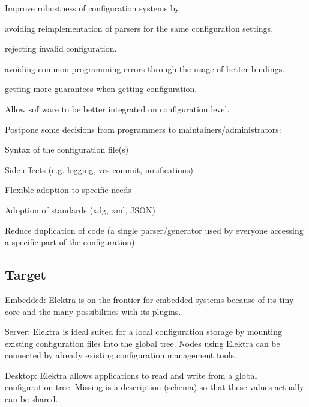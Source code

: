 
\begin{DoxyItemize}
\item Improve robustness of configuration systems by
\begin{DoxyItemize}
\item avoiding reimplementation of parsers for the same configuration settings.
\item rejecting invalid configuration.
\item avoiding common programming errors through the usage of better bindings.
\item getting more guarantees when getting configuration.
\end{DoxyItemize}
\item Allow software to be better integrated on configuration level.
\item Postpone some decisions from programmers to maintainers/administrators\+:
\begin{DoxyItemize}
\item Syntax of the configuration file(s)
\item Side effects (e.\+g. logging, vcs commit, notifications)
\item Flexible adoption to specific needs
\item Adoption of standards (xdg, xml, J\+S\+ON)
\end{DoxyItemize}
\item Reduce duplication of code (a single parser/generator used by everyone accessing a specific part of the configuration).
\end{DoxyItemize}

\subsection*{Target}


\begin{DoxyItemize}
\item Embedded\+: Elektra is on the frontier for embedded systems because of its tiny core and the many possibilities with its plugins.
\item Server\+: Elektra is ideal suited for a local configuration storage by mounting existing configuration files into the global tree. Nodes using Elektra can be connected by already existing configuration management tools.
\item Desktop\+: Elektra allows applications to read and write from a global configuration tree. Missing is a description (schema) so that these values actually can be shared.
\end{DoxyItemize}

